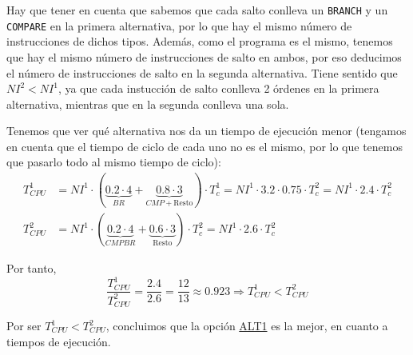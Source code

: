 \begin{ejercicio}
    Hay que tener en cuenta que sabemos que cada salto conlleva un \verb|BRANCH| y un \verb|COMPARE| en la primera alternativa,
    por lo que hay el mismo número de instrucciones de dichos tipos. Además, como el programa es el mismo,
    tenemos que hay el mismo número de instrucciones de salto en ambos, por eso deducimos el número de instrucciones de salto en la segunda alternativa.
    Tiene sentido que $NI^2 < NI^1$, ya que cada instucción de salto conlleva 2 órdenes en la primera alternativa, mientras que en la segunda conlleva una sola.

    Tenemos que ver qué alternativa nos da un tiempo de ejecución menor
    (tengamos en cuenta que el tiempo de ciclo de cada uno no es el mismo, por lo que tenemos que pasarlo todo al mismo tiempo de ciclo):
    \begin{align*}
        T_{CPU}^1 &= NI^1 \cdot (\underbrace{0.2 \cdot 4}_{BR} + \underbrace{0.8 \cdot 3}_{CMP+\text{Resto}}) \cdot T_c^1 = NI^1 \cdot 3.2 \cdot 0.75 \cdot T_c^2 = NI^1 \cdot 2.4 \cdot T_c^2\\
        T_{CPU}^2 &= NI^1 \cdot (\underbrace{0.2 \cdot 4}_{CMPBR} + \underbrace{0.6\cdot 3}_{\text{Resto}}) \cdot T_c^2 = NI^1 \cdot 2.6 \cdot T_c^2
    \end{align*}

    Por tanto,
    \begin{equation*}
        \frac{T_{CPU}^1}{T_{CPU}^2} = \frac{2.4}{2.6} = \frac{12}{13} \approx 0.923 \Longrightarrow T_{CPU}^1 < T_{CPU}^2
    \end{equation*}

    Por ser $T_{CPU}^1 < T_{CPU}^2$, concluimos que la opción \ul{ALT1} es la mejor, en cuanto a tiempos de ejecución.
\end{ejercicio}

